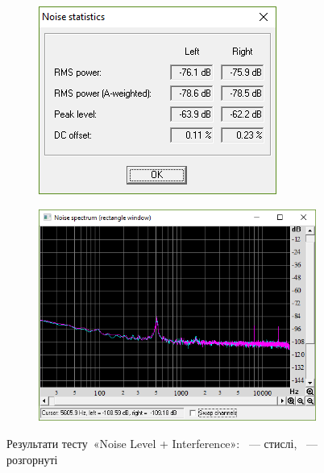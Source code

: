 \documentclass[
	a4paper,
	oneside,
	BCOR = 10mm,
	DIV = 12,
	12pt,
	headings = normal,
]{scrartcl}
\begin{document}
			\begin{figure}[!htbp]
				\centering
				\begin{subfigure}[t]{\columnwidth / 2}
					\centering
					\includegraphics[height=08\baselineskip]{./assets/y03s02-pcdiag-lab-07-p03-01-noise.png}
					\caption{}
					\label{subfig:sca-noise}
				\end{subfigure}%
				\begin{subfigure}[t]{\columnwidth / 2}
					\centering
					\includegraphics[height=08\baselineskip]{./assets/y03s02-pcdiag-lab-07-p03-02-noise-det.png}
					\caption{}
					\label{subfig:sca-noise-det}
				\end{subfigure}
				\caption{Результати тесту~«\textenglish{Noise Level + Interference}»: ~— стислі, ~— розгорнуті}
				\label{fig:sca-noise}
			\end{figure}
\end{document}
